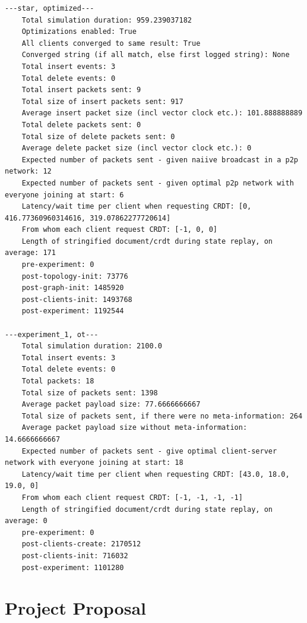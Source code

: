 \documentclass[12pt,a4paper,twoside,openright]{report}
\begin{document}
\begin{verbatim}
---star, optimized---
	Total simulation duration: 959.239037182
	Optimizations enabled: True
	All clients converged to same result: True
	Converged string (if all match, else first logged string): None
	Total insert events: 3
	Total delete events: 0
	Total insert packets sent: 9
	Total size of insert packets sent: 917
	Average insert packet size (incl vector clock etc.): 101.888888889
	Total delete packets sent: 0
	Total size of delete packets sent: 0
	Average delete packet size (incl vector clock etc.): 0
	Expected number of packets sent - given naiive broadcast in a p2p network: 12
	Expected number of packets sent - given optimal p2p network with everyone joining at start: 6
	Latency/wait time per client when requesting CRDT: [0, 416.77360960314616, 319.07862277720614]
	From whom each client request CRDT: [-1, 0, 0]
	Length of stringified document/crdt during state replay, on average: 171
	pre-experiment: 0
	post-topology-init: 73776
	post-graph-init: 1485920
	post-clients-init: 1493768
	post-experiment: 1192544

---experiment_1, ot---
	Total simulation duration: 2100.0
	Total insert events: 3
	Total delete events: 0
	Total packets: 18
	Total size of packets sent: 1398
	Average packet payload size: 77.6666666667
	Total size of packets sent, if there were no meta-information: 264
	Average packet payload size without meta-information: 14.6666666667
	Expected number of packets sent - give optimal client-server network with everyone joining at start: 18
	Latency/wait time per client when requesting CRDT: [43.0, 18.0, 19.0, 0]
	From whom each client request CRDT: [-1, -1, -1, -1]
	Length of stringified document/crdt during state replay, on average: 0
	pre-experiment: 0
	post-clients-create: 2170512
	post-clients-init: 716032
	post-experiment: 1101280

\end{verbatim}

\chapter{Project Proposal}


\end{document}
